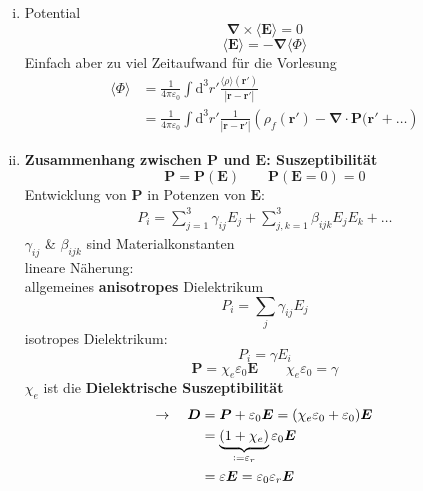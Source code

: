 \documentclass[titlepage,11pt,a4paper,ngerman]{report}
\newcommand*{\defeq}{\mathrel{\vcenter{\baselineskip0.5ex \lineskiplimit0pt \hbox{\scriptsize.}\hbox{\scriptsize.}}}=}
\newcommand{\tx}[1]{\textrm{#1}}
\newcommand{\ub}[1]{\underbrace{#1}}
\newcommand{\dd}{\tx{d}}
\renewcommand{\Phi}{\varPhi}
\newcommand{\kq}{\frac{1}{4\pi\epsilon_0}}
\renewcommand{\vec}[1]{\boldsymbol{#1}}
\renewcommand{\epsilon}{\varepsilon}
\newcommand{\vabla}{\boldsymbol{\nabla}}
\begin{document}
\begin{enumerate}[i)]
\begin{minipage}{.5\linewidth}
\begin{tikzpicture}
		\end{tikzpicture}
	\end{minipage}%
	\item Potential
	\begin{equation*}
	\vabla \times \langle \vec{E} \rangle = 0
	\end{equation*}
	\begin{equation*}
	\langle \vec{E} \rangle = - \vabla \langle \Phi \rangle
	\end{equation*}
	Einfach aber zu viel Zeitaufwand für die Vorlesung
	\begin{align*}
	\langle \Phi \rangle &= \kq \int \dd^3  r' \frac{\langle \rho \rangle (\vec{r}')}{|\vec{r} - \vec{r}'|} \\
	&= \kq \int \dd ^3 r' \frac{1}{|\vec{r} - \vec{r}'|}\left(\rho_f(\vec{r}') - \vabla \cdot \vec{P}(\vec{r}' + \dots \right)
	\end{align*}
	\item \textbf{Zusammenhang zwischen $ \vec{P} $ und $ \vec{E} $: Suszeptibilität}
	\begin{equation*}
	\vec{P} = \vec{P(\vec{E})} \qquad \vec{P}(\vec{E} = 0) = 0
	\end{equation*}
	Entwicklung von $ \vec{P} $ in Potenzen von $ \vec{E} $:
	\begin{align*}
	P_i = \sum_{j=1}^{3} \gamma_{ij} E_j + \sum_{j,k=1}^{3} \beta_{ijk} E_j E_k + \dots
	\end{align*}
	$ \gamma_{ij} $ \& $ \beta_{ijk} $ sind Materialkonstanten\\
	lineare Näherung:\\
	allgemeines \textbf{anisotropes} Dielektrikum
	\begin{equation*}
	P_i = \sum_j \gamma_{ij} E_j
	\end{equation*}
	isotropes Dielektrikum:
	\begin{equation*}
	P_i = \gamma E_i
	\end{equation*}
	\begin{equation*}
	\vec{P} = \chi_e \epsilon_0 \vec{E} \qquad \chi_e \epsilon_0 = \gamma
	\end{equation*}
	$ \chi_e $ ist die \textbf{Dielektrische Suszeptibilität}
	\begin{align*}
	\rightarrow \quad \vec{D} &= \vec{P} + \epsilon_0 \vec{E} = (\chi_e \epsilon_0 + \epsilon_0) \vec{E} \\
	&= \ub{(1 + \chi_e)}_{\defeq \epsilon_r} \epsilon_0 \vec{E} \\
	&= \epsilon \vec{E} = \epsilon_0 \epsilon_r \vec{E}

\end{align*}
\end{enumerate}
\end{document}
